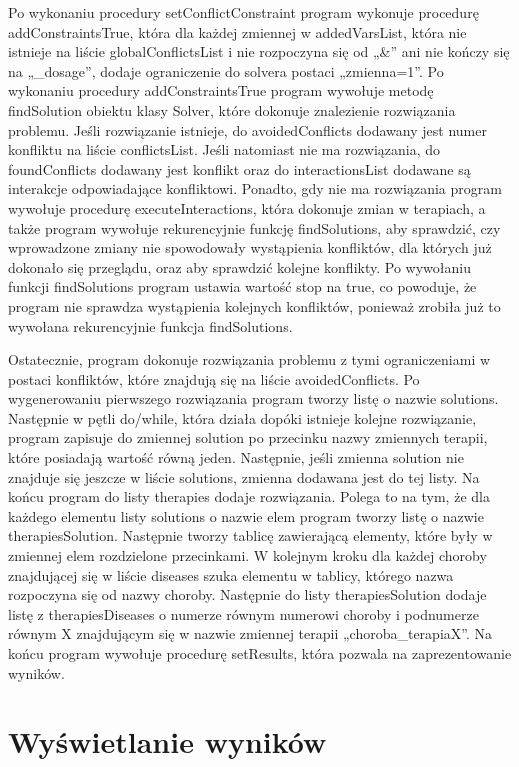 \documentclass[oneside,a4paper]{book}
\begin{document}
\begin{spacing}{1.5}
Po wykonaniu procedury setConflictConstraint program wykonuje procedurę addConstraintsTrue, która dla każdej zmiennej w addedVarsList, która nie istnieje na liście globalConflictsList i nie rozpoczyna się od „\&” ani nie kończy się na „\_dosage”, dodaje ograniczenie do solvera postaci „zmienna=1”. Po wykonaniu procedury addConstraintsTrue program wywołuje metodę findSolution obiektu klasy Solver, które dokonuje znalezienie rozwiązania problemu. Jeśli rozwiązanie istnieje, do avoidedConflicts dodawany jest numer konfliktu na liście conflictsList. Jeśli natomiast nie ma rozwiązania, do foundConflicts dodawany jest konflikt oraz do interactionsList dodawane są interakcje odpowiadające konfliktowi. Ponadto, gdy nie ma rozwiązania program wywołuje procedurę executeInteractions, która dokonuje zmian w terapiach, a także program wywołuje rekurencyjnie funkcję findSolutions, aby sprawdzić, czy wprowadzone zmiany nie spowodowały wystąpienia konfliktów, dla których już dokonało się przeglądu, oraz aby sprawdzić kolejne konflikty. Po wywołaniu funkcji findSolutions program ustawia wartość stop na true, co powoduje, że program nie sprawdza wystąpienia kolejnych konfliktów, ponieważ zrobiła już to wywołana rekurencyjnie funkcja findSolutions. 

Ostatecznie, program dokonuje rozwiązania problemu z tymi ograniczeniami w postaci konfliktów, które znajdują się na liście avoidedConflicts. Po wygenerowaniu pierwszego rozwiązania program tworzy listę o nazwie solutions. Następnie w pętli do/while, która działa dopóki istnieje kolejne rozwiązanie, program zapisuje do zmiennej solution po przecinku nazwy zmiennych terapii, które posiadają wartość równą jeden. Następnie, jeśli zmienna solution nie znajduje się jeszcze w liście solutions, zmienna dodawana jest do tej listy. Na końcu program do listy therapies dodaje rozwiązania. Polega to na tym, że dla każdego elementu listy solutions o nazwie elem program tworzy listę o nazwie therapiesSolution. Następnie tworzy tablicę zawierającą elementy, które były w zmiennej elem rozdzielone przecinkami. W kolejnym kroku dla każdej choroby znajdującej się w liście diseases szuka elementu w tablicy, którego nazwa rozpoczyna się od nazwy choroby. Następnie do listy therapiesSolution dodaje listę z therapiesDiseases o numerze równym numerowi choroby i podnumerze równym X znajdującym się w nazwie zmiennej terapii „choroba\_terapiaX”. Na końcu program wywołuje procedurę setResults, która pozwala na zaprezentowanie wyników. 

\section{Wyświetlanie wyników}


\end{spacing}
\end{document}
